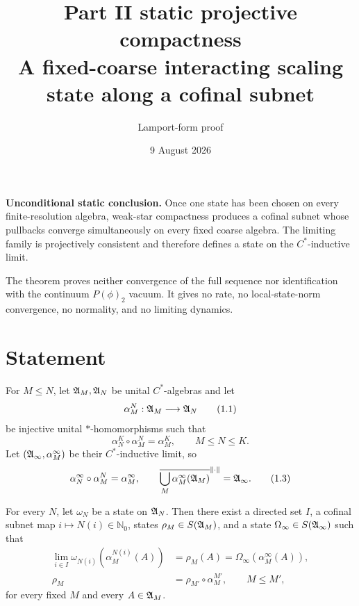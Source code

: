 \documentclass[11pt,a4paper]{article}
\title{Part II static projective compactness\\[3pt]
\large A fixed-coarse interacting scaling state along a cofinal subnet}
\author{Lamport-form proof}
\date{9 August 2026}
\begin{document}
\maketitle

\begin{resultbox}
\textbf{Unconditional static conclusion.}  Once one state has been chosen on every
finite-resolution algebra, weak-star compactness produces a cofinal subnet whose
pullbacks converge simultaneously on every fixed coarse algebra.  The limiting family
is projectively consistent and therefore defines a state on the \(C^*\)-inductive limit.

The theorem proves neither convergence of the full sequence nor identification with the
continuum \(P(\phi)_2\) vacuum.  It gives no rate, no local-state-norm convergence, no
normality, and no limiting dynamics.
\end{resultbox}

\tableofcontents

\section{Statement}

\begin{definition}
For \(M\le N\), let \(\mathfrak A_M,\mathfrak A_N\) be unital \(C^*\)-algebras and let
\[
 \alpha_M^N:\mathfrak A_M\longrightarrow\mathfrak A_N                              \tag{1.1}
\]
be injective unital \( * \)-homomorphisms such that
\[
 \alpha_N^K\circ\alpha_M^N=\alpha_M^K,\qquad M\le N\le K.        \tag{1.2}
\]
Let \((\mathfrak A_\infty,\alpha_M^\infty)\) be their \(C^*\)-inductive limit, so
\[
 \alpha_N^\infty\circ\alpha_M^N=\alpha_M^\infty,\qquad
 \overline{\bigcup_M\alpha_M^\infty(\mathfrak A_M)}^{\|\cdot\|}
 =\mathfrak A_\infty.                                                    \tag{1.3}
\]
\end{definition}

\begin{theorem}\label{thm:compactness}
For every \(N\), let \(\omega_N\) be a state on \(\mathfrak A_N\).  Then there exist a
directed set \(I\), a cofinal subnet map \(i\mapsto N(i)\in\mathbb N_0\), states
\(\rho_M\in S(\mathfrak A_M)\), and a state \(\Omega_\infty\in S(\mathfrak A_\infty)\) such that
\begin{align}
 \lim_{i\in I}\omega_{N(i)}(\alpha_M^{N(i)}(A))
 &=\rho_M(A)
 =\Omega_\infty(\alpha_M^\infty(A)),                            \tag{1.4}\\
 \rho_M&=\rho_{M'}\circ\alpha_M^{M'},\qquad M\le M',             \tag{1.5}
\end{align}
for every fixed \(M\) and every \(A\in\mathfrak A_M\).
\end{theorem}
\end{document}
